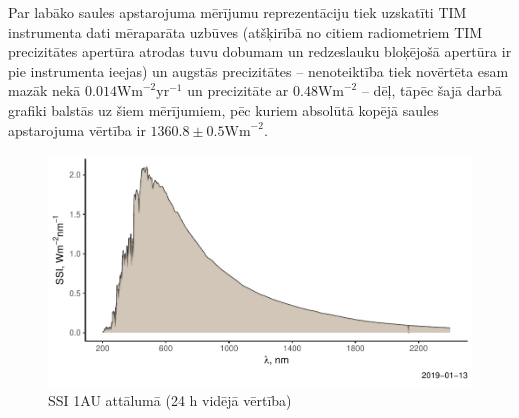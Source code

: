 
Par labāko saules apstarojuma mērījumu reprezentāciju tiek uzskatīti TIM instrumenta dati mēraparāta uzbūves (atšķirībā no citiem radiometriem TIM precizitātes apertūra atrodas tuvu dobumam un redzeslauku bloķējošā apertūra ir pie instrumenta ieejas) un augstās precizitātes -- nenoteiktība tiek novērtēta esam mazāk nekā $0.014\textrm{Wm}^{-2}\textrm{yr}^{-1}$ un precizitāte ar $0.48\textrm{Wm}^{-2}$ \cite{TSIdata} -- dēļ, tāpēc šajā darbā grafiki balstās uz šiem mērījumiem, pēc kuriem absolūtā kopējā saules apstarojuma vērtība ir $1360.8 \pm 0.5 \textrm{Wm}^{-2}$.\cite{Frohlich2012}

\begin{figure}[h]
    \centering
    \includegraphics[width=\linewidth]{figures/misc/SSI.pdf}
    \caption{SSI 1AU attālumā (24 h vidējā vērtība) \cite{SSIdata}}
    \label{fig:SSI}
\end{figure}


